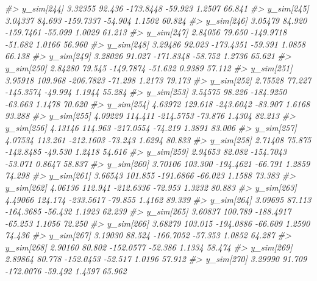 \documentclass[
  10pt,
  italian,
  a4paper,
  extrafontsizes,onecolumn,openright
  ]{memoir}
\newenvironment{Shaded}{\begin{snugshade}}{\end{snugshade}}
\newcommand{\CommentTok}[1]{\textcolor[rgb]{0.56,0.35,0.01}{\textit{#1}}}
\begin{document}
\begin{Shaded}
\begin{Highlighting}[]
\CommentTok{\#\textgreater{}   y\_sim[244]  3.32355  92.436 {-}173.8448 {-}59.923  1.2507  66.841}
\CommentTok{\#\textgreater{}   y\_sim[245]  3.04337  84.693 {-}159.7337 {-}54.904  1.1502  60.824}
\CommentTok{\#\textgreater{}   y\_sim[246]  3.05479  84.920 {-}159.7461 {-}55.099  1.0029  61.213}
\CommentTok{\#\textgreater{}   y\_sim[247]  2.84056  79.650 {-}149.9718 {-}51.682  1.0166  56.960}
\CommentTok{\#\textgreater{}   y\_sim[248]  3.29486  92.023 {-}173.4351 {-}59.391  1.0858  66.138}
\CommentTok{\#\textgreater{}   y\_sim[249]  3.28026  91.027 {-}171.8348 {-}58.752  1.2736  65.621}
\CommentTok{\#\textgreater{}   y\_sim[250]  2.84280  79.545 {-}149.7874 {-}51.632  0.9389  57.112}
\CommentTok{\#\textgreater{}   y\_sim[251]  3.95918 109.968 {-}206.7823 {-}71.298  1.2173  79.173}
\CommentTok{\#\textgreater{}   y\_sim[252]  2.75528  77.227 {-}145.3574 {-}49.994  1.1944  55.284}
\CommentTok{\#\textgreater{}   y\_sim[253]  3.54575  98.226 {-}184.9250 {-}63.663  1.1478  70.620}
\CommentTok{\#\textgreater{}   y\_sim[254]  4.63972 129.618 {-}243.6042 {-}83.907  1.6168  93.288}
\CommentTok{\#\textgreater{}   y\_sim[255]  4.09229 114.411 {-}214.5753 {-}73.876  1.4304  82.213}
\CommentTok{\#\textgreater{}   y\_sim[256]  4.13146 114.963 {-}217.0554 {-}74.219  1.3891  83.006}
\CommentTok{\#\textgreater{}   y\_sim[257]  4.07534 113.261 {-}212.1603 {-}73.243  1.6294  80.833}
\CommentTok{\#\textgreater{}   y\_sim[258]  2.71408  75.875 {-}142.8485 {-}49.530  1.2418  54.616}
\CommentTok{\#\textgreater{}   y\_sim[259]  2.94653  82.082 {-}154.7043 {-}53.071  0.8647  58.837}
\CommentTok{\#\textgreater{}   y\_sim[260]  3.70106 103.300 {-}194.4621 {-}66.791  1.2859  74.298}
\CommentTok{\#\textgreater{}   y\_sim[261]  3.66543 101.855 {-}191.6866 {-}66.023  1.1588  73.383}
\CommentTok{\#\textgreater{}   y\_sim[262]  4.06136 112.941 {-}212.6336 {-}72.953  1.3232  80.883}
\CommentTok{\#\textgreater{}   y\_sim[263]  4.49066 124.174 {-}233.5617 {-}79.855  1.4162  89.339}
\CommentTok{\#\textgreater{}   y\_sim[264]  3.09695  87.113 {-}164.3685 {-}56.432  1.1923  62.239}
\CommentTok{\#\textgreater{}   y\_sim[265]  3.60837 100.789 {-}188.4917 {-}65.253  1.1056  72.250}
\CommentTok{\#\textgreater{}   y\_sim[266]  3.68279 103.015 {-}194.0886 {-}66.609  1.2590  74.436}
\CommentTok{\#\textgreater{}   y\_sim[267]  3.19030  88.524 {-}166.7052 {-}57.353  1.0852  64.287}
\CommentTok{\#\textgreater{}   y\_sim[268]  2.90160  80.802 {-}152.0577 {-}52.386  1.1334  58.474}
\CommentTok{\#\textgreater{}   y\_sim[269]  2.89864  80.778 {-}152.0453 {-}52.517  1.0196  57.912}
\CommentTok{\#\textgreater{}   y\_sim[270]  3.29990  91.709 {-}172.0076 {-}59.492  1.4597  65.962}

\end{Highlighting}
\end{Shaded}
\end{document}
